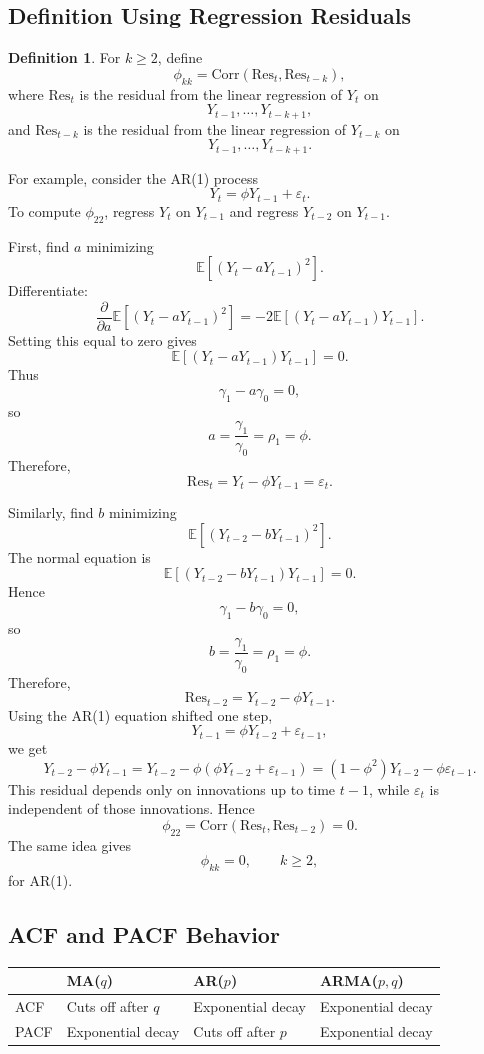 \documentclass[12pt,oneside]{book}
\numberwithin{equation}{section}
\theoremstyle{definition}
\newtheorem{definition}{Definition}[section]
\theoremstyle{plain}
\theoremstyle{remark}
\newcommand{\E}{\mathbb{E}}
\newcommand{\Corr}{\mathrm{Corr}}
\begin{document}
\subsection{Definition Using Regression Residuals}

\begin{definition}
For $k\geq 2$, define
\[
\phi_{kk}
=
\Corr(\mathrm{Res}_t,\mathrm{Res}_{t-k}),
\]
where $\mathrm{Res}_t$ is the residual from the linear regression of $Y_t$ on
\[
Y_{t-1},\ldots,Y_{t-k+1},
\]
and $\mathrm{Res}_{t-k}$ is the residual from the linear regression of $Y_{t-k}$ on
\[
Y_{t-1},\ldots,Y_{t-k+1}.
\]
\end{definition}

For example, consider the AR(1) process
\[
Y_t=\phi Y_{t-1}+\varepsilon_t.
\]
To compute $\phi_{22}$, regress $Y_t$ on $Y_{t-1}$ and regress $Y_{t-2}$ on $Y_{t-1}$.

First, find $a$ minimizing
\[
\E[(Y_t-aY_{t-1})^2].
\]
Differentiate:
\[
\frac{\partial}{\partial a}\E[(Y_t-aY_{t-1})^2]
=
-2\E[(Y_t-aY_{t-1})Y_{t-1}].
\]
Setting this equal to zero gives
\[
\E[(Y_t-aY_{t-1})Y_{t-1}]=0.
\]
Thus
\[
\gamma_1-a\gamma_0=0,
\]
so
\[
a=\frac{\gamma_1}{\gamma_0}=\rho_1=\phi.
\]
Therefore,
\[
\mathrm{Res}_t=Y_t-\phi Y_{t-1}=\varepsilon_t.
\]

Similarly, find $b$ minimizing
\[
\E[(Y_{t-2}-bY_{t-1})^2].
\]
The normal equation is
\[
\E[(Y_{t-2}-bY_{t-1})Y_{t-1}]=0.
\]
Hence
\[
\gamma_1-b\gamma_0=0,
\]
so
\[
b=\frac{\gamma_1}{\gamma_0}=\rho_1=\phi.
\]
Therefore,
\[
\mathrm{Res}_{t-2}=Y_{t-2}-\phi Y_{t-1}.
\]
Using the AR(1) equation shifted one step,
\[
Y_{t-1}=\phi Y_{t-2}+\varepsilon_{t-1},
\]
we get
\[
Y_{t-2}-\phi Y_{t-1}
=
Y_{t-2}-\phi(\phi Y_{t-2}+\varepsilon_{t-1})
=
(1-\phi^2)Y_{t-2}-\phi\varepsilon_{t-1}.
\]
This residual depends only on innovations up to time $t-1$, while $\varepsilon_t$ is independent of those innovations. Hence
\[
\phi_{22}
=
\Corr(\mathrm{Res}_t,\mathrm{Res}_{t-2})
=
0.
\]
The same idea gives
\[
\phi_{kk}=0,
\qquad k\geq 2,
\]
for AR(1).

\subsection*{ACF and PACF Behavior}

\begin{xltabular}{\textwidth}{l l l l}
\toprule
 & MA($q$) & AR($p$) & ARMA($p,q$) \\
\midrule
ACF & Cuts off after $q$ & Exponential decay & Exponential decay \\
PACF & Exponential decay & Cuts off after $p$ & Exponential decay \\
\bottomrule
\end{xltabular}
\end{document}
